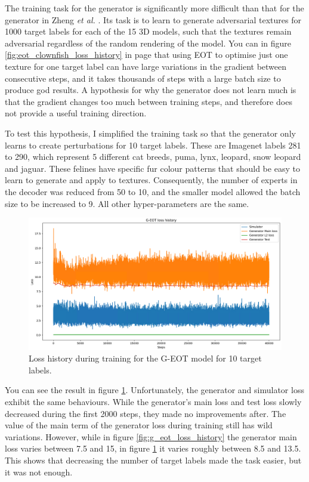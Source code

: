 The training task for the generator is significantly more difficult than that for the generator in Zheng \textit{et al.} \cite{zheng_black_box_GAN}. Its task is to learn to generate adversarial textures for 1000 target labels for each of the 15 3D models, such that the textures remain adversarial regardless of the random rendering of the model. You can in figure \ref{fig:eot_clownfish_loss_history} in page \pageref{fig:eot_clownfish_loss_history} that using EOT to optimise just one texture for one target label can have large variations in the gradient between consecutive steps, and it takes thousands of steps with a large batch size to produce god results. A hypothesis for why the generator does not learn much is that the gradient changes too much between training steps, and therefore does not provide a useful training direction.

To test this hypothesis, I simplified the training task so that the generator only learns to create perturbations for 10 target labels. These are Imagenet labels 281 to 290, which represent 5 different cat breeds, puma, lynx, leopard, snow leopard and jaguar. These felines have specific fur colour patterns that should be easy to learn to generate and apply to textures. Consequently, the number of experts in the decoder was reduced from 50 to 10, and the smaller model allowed the batch size to be increased to 9. All other hyper-parameters are the same.

\begin{figure}[ht]
    \centering
    \includegraphics[width=1\textwidth]{graphics/g_eot_loss_exp2.PNG}
    \caption{Loss history during training for the G-EOT model for 10 target labels.}
    \label{fig:g_eot_loss_exp2}
\end{figure}

You can see the result in figure \ref{fig:g_eot_loss_exp2}. Unfortunately, the generator and simulator loss exhibit the same behaviours. While the generator's main loss and test loss slowly decreased during the first 2000 steps, they made no improvements after. The value of the main term of the generator loss during training still has wild variations. However, while in figure \ref{fig:g_eot_loss_history} the generator main loss varies between 7.5 and 15, in figure \ref{fig:g_eot_loss_exp2} it varies roughly between 8.5 and 13.5. This shows that decreasing the number of target labels made the task easier, but it was not enough.
    
